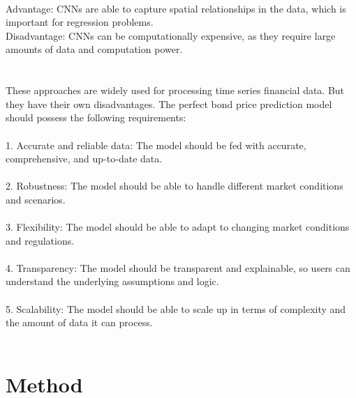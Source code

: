 \documentclass{article}
\begin{document}
\\
Advantage: CNNs are able to capture spatial relationships in the data, which is important for regression problems.\\
Disadvantage: CNNs can be computationally expensive, as they require large amounts of data and computation power.\\
\\
\\
These approaches are widely used for processing time series financial data. But they have their own disadvantages. The perfect bond price prediction model should possess the following requirements:\\
\\
1. Accurate and reliable data: The model should be fed with accurate, comprehensive, and up-to-date data.\\
\\
2. Robustness: The model should be able to handle different market conditions and scenarios.\\
\\
3. Flexibility: The model should be able to adapt to changing market conditions and regulations.\\
\\
4. Transparency: The model should be transparent and explainable, so users can understand the underlying assumptions and logic.\\
\\
5. Scalability: The model should be able to scale up in terms of complexity and the amount of data it can process.\\
\\

\section{Method}
\end{document}
